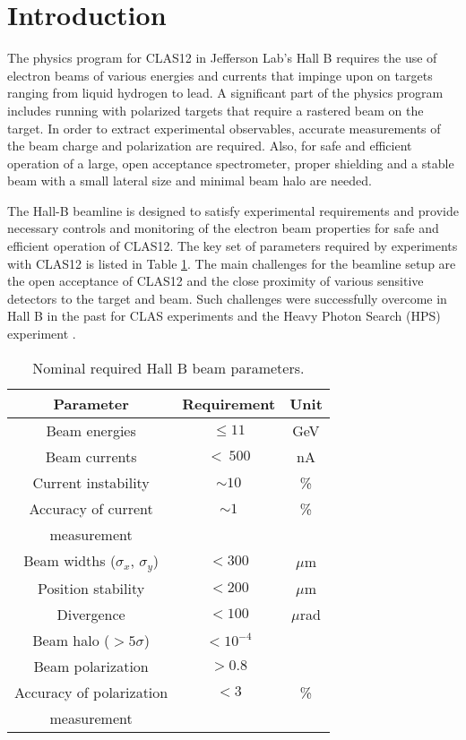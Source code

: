 \section{Introduction}
\label{introduction}

The physics program for CLAS12 in Jefferson Lab's Hall B requires the use of electron beams of various energies and currents that impinge
upon on targets ranging from liquid hydrogen to lead. A significant part of the physics program includes running with polarized targets that 
require a rastered beam on the target. In order to extract experimental observables, accurate measurements of the beam charge and 
polarization are required. Also, for safe and efficient operation of a large, open acceptance spectrometer, proper shielding and a stable beam 
with a small lateral size and minimal beam halo are needed. 

The Hall-B beamline is designed to satisfy experimental requirements and provide necessary controls and monitoring 
of the electron beam properties for safe and efficient operation of CLAS12. The key set of parameters required by experiments with CLAS12 
is listed in Table \ref{tab:beam_par}. The main challenges for the beamline setup are the open acceptance of CLAS12 and the close proximity 
of various sensitive detectors to the target and beam. Such challenges were successfully overcome in Hall B in the past for CLAS \cite{CLAS} 
experiments and the Heavy Photon Search (HPS) experiment \cite{HPS}.

 \begin{table}[htb]
 \centering
 \begin{tabular}{|c|c|c|}
\hline
Parameter & Requirement &Unit \\ \hline 
Beam energies &  $\le 11$& GeV \\ \hline
Beam currents & $<~500$ & nA \\ \hline
Current instability & $\sim 10$ &\% \\ \hline 
Accuracy of current& $\sim 1$ &\% \\ 
measurement & &\\ \hline 
Beam widths ($\sigma_x $, $\sigma_y$)&$< 300$& $\mu$m \\ \hline 
Position stability &$< 200$ &$\mu$m \\ \hline
Divergence& $< 100$& $\mu$rad \\ \hline 
Beam halo ($> 5\sigma$) &$< 10^{-4}$& \\ \hline
Beam polarization &$> 0.8$& \\ \hline
Accuracy of polarization&$<3$&\% \\ 
measurement&& \\ \hline
\end{tabular}
\caption{Nominal required Hall B beam parameters.} 
\label{tab:beam_par}
\end{table}

